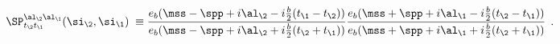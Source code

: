 \begin{equation}
\SP^{\al_\2\al_\1}_{t_\2t_\1}(\si_\2,\si_\1)\;\equiv
\frac{e_b(\mss-\spp+i\al_\2-i\frac{b}{2}(t_\1-t_\2))}
{e_b(\mss-\spp+i\al_\2+i\frac{b}{2}(t_\2+t_\1))}
\frac{e_b(\mss+\spp+i\al_\1-i\frac{b}{2}(t_\2-t_\1))}
{e_b(\mss+\spp+i\al_\1+i\frac{b}{2}(t_\2+t_\1))}\;\, .
\end{equation}

